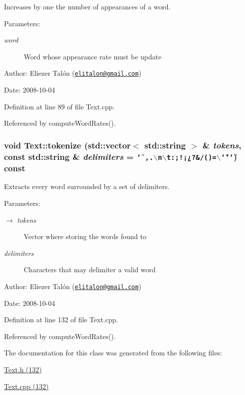 Increases by one the number of appearances of a word. 

\begin{Desc}
\item[Parameters:]
\begin{description}
\item[{\em word}]Word whose appearance rate must be update\end{description}
\end{Desc}
\begin{Desc}
\item[Author:]Eliezer Talón (\href{mailto:elitalon@gmail.com}{\tt elitalon@gmail.com}) \end{Desc}
\begin{Desc}
\item[Date:]2008-10-04 \end{Desc}


Definition at line 89 of file Text.cpp.

Referenced by computeWordRates().\hypertarget{class_text_6b26c004c1cac61015f7d49c364a007d}{
\subsubsection[tokenize]{\setlength{\rightskip}{0pt plus 5cm}void Text::tokenize (std::vector$<$ std::string $>$ \& {\em tokens}, \/  const std::string \& {\em delimiters} = {\tt \char`\"{}~,.$\backslash$n$\backslash$t:;!¡¿?\&/()=$\backslash$\char`\"{}'\char`\"{}}) const}}
\label{class_text_6b26c004c1cac61015f7d49c364a007d}


Extracts every word surrounded by a set of delimiters. 

\begin{Desc}
\item[Parameters:]
\begin{description}
\item[\mbox{$\rightarrow$} {\em tokens}]Vector where storing the words found to \item[{\em delimiters}]Characters that may delimiter a valid word\end{description}
\end{Desc}
\begin{Desc}
\item[Author:]Eliezer Talón (\href{mailto:elitalon@gmail.com}{\tt elitalon@gmail.com}) \end{Desc}
\begin{Desc}
\item[Date:]2008-10-04 \end{Desc}


Definition at line 132 of file Text.cpp.

Referenced by computeWordRates().

The documentation for this class was generated from the following files:\begin{CompactItemize}
\item 
\hyperlink{_text_8h}{Text.h (132)}\item 
\hyperlink{_text_8cpp}{Text.cpp (132)}\end{CompactItemize}
